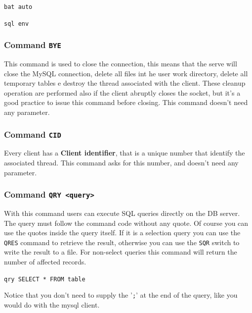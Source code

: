 \documentclass[12pt,titlepage]{book}
\begin{document}
\bigskip
\verb|bat auto|

\verb|sql env|
\bigskip


\subsubsection{Command \tt{BYE}}
This command is used to close the connection, this means that the serve will
close the MySQL connection, delete all files int he user work directory,
delete all temporary tables e destroy the thread associated with the
client. These cleanup operation are performed also if the client abruptly
closes the socket, but it's a good practice to issue this command before
closing. This command doesn't need any parameter.




\subsubsection{Command \tt{CID}}
Every client has a \textbf{Client identifier}, that is a unique number that
identify the associated thread. This command asks for this number, and doesn't
need any parameter.

\subsubsection{Command \tt{QRY <query>}}
With this command users can execute SQL queries directly on the DB server. The
query must follow the command code without any quote. Of course you can use
the quotes inside the query itself. If it is a selection query you can use the
\verb|QRES| command to retrieve the result, otherwise you can use the
\verb|SQR| switch to write the result to a file. For non-select queries this
command will return the number of affected records.

\bigskip
\verb|qry SELECT * FROM table|
\bigskip

\noindent Notice that you don't need to supply the '\verb|;|' at the
end of the query, like you would do with the mysql client.
\end{document}
